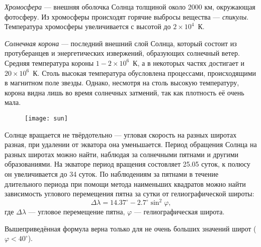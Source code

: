 \textit{Хромосфера} --- внешняя оболочка Солнца толщиной около 2000 км, окружающая фотосферу. Из хромосферы происходят горячие  выбросы вещества --- \textit{спикулы}. Температура хромосферы увеличивается с высотой до $2\times10^4$~К.

\textit{Солнечная корона} --- последний внешний слой Солнца, который состоит из протуберанцев и энергетических  извержений, образующих солнечный ветер. Средняя температура короны $1-2\times10^6$~К, а в некоторых частях достигает  и $20\times10^6$~К. Столь высокая температура обусловлена процессами, происходящими в магнитном поле звезды. Однако, несмотря на столь высокую температуру, корона видна лишь во время солнечных затмений, так как плотность её очень мала.
  
  
  
\begin{figure}
\begin{center}
\texttt{[image: sun]}
\end{center}
\end{figure}

Солнце вращается не твёрдотельно --- угловая скорость на разных широтах разная, при удалении от экватора она уменьшается. Период обращения Солнца на разных широтах можно найти, наблюдая за солнечными пятнами и другими образованиями. На экваторе период вращения состовляет 25.05 суток, к полюсу он увеличивается до 34 суток. По наблюдениям за пятнами в течение длительного периода при помощи метода наименьших квадратов можно найти зависимость углового перемещения пятна за сутки от гелиографической широты:
\begin{equation}
\Delta\lambda=14.37^{\circ}-2.7^{\circ}\sin^2\varphi,
\end{equation}
где $\Delta\lambda$ --- угловое перемещение пятна, $\varphi$ --- гелиографическая широта.

Вышеприведённая формула верна только для не очень больших значений широт ($\varphi<40^{\circ}$).